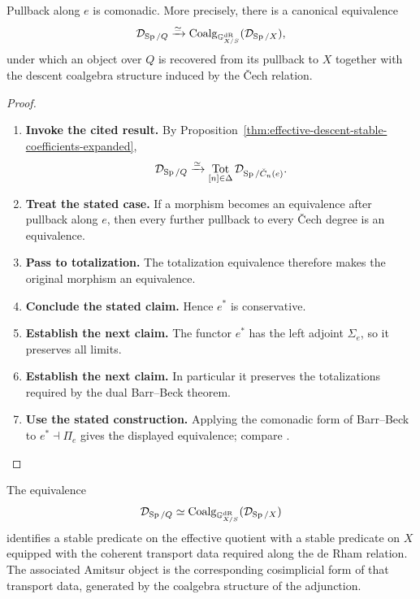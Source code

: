 \begin{theorem}
\label{thm:comonadic-effective-descent-de-Rham}
Pullback along \(e\) is comonadic. More precisely, there is a canonical
equivalence
\[
  \mathcal D_{\operatorname{Sp}/Q}
  \xrightarrow{\simeq}
  \operatorname{Coalg}_{\mathbb G^{\mathrm{dR}}_{X/S}}(\mathcal D_{\operatorname{Sp}/X}),
\]
under which an object over \(Q\) is recovered from its pullback to \(X\) together
with the descent coalgebra structure induced by the \v{C}ech relation.
\end{theorem}

\begin{proof}
\leavevmode
\begin{enumerate}[label=\textup{(\arabic*)}]
    \item \textbf{Invoke the cited result.}
    By Proposition~\ref{thm:effective-descent-stable-coefficients-expanded},
    \[
    \mathcal D_{\operatorname{Sp}/Q}
    \xrightarrow{\simeq}
    \operatorname*{Tot}_{[n]\in\Delta}\mathcal D_{\operatorname{Sp}/\check C_n(e)}.
    \]
    \item \textbf{Treat the stated case.}
    If a morphism becomes an equivalence after pullback along \(e\), then every
    further pullback to every \v{C}ech degree is an equivalence.
    \item \textbf{Pass to totalization.}
    The totalization
    equivalence therefore makes the original morphism an equivalence.
    \item \textbf{Conclude the stated claim.}
    Hence
    \(e^*\) is conservative.
    \item \textbf{Establish the next claim.}
    The functor \(e^*\) has the left adjoint \(\Sigma_e\), so it preserves all
    limits.
    \item \textbf{Establish the next claim.}
    In particular it preserves the totalizations required by the dual
    Barr--Beck theorem.
    \item \textbf{Use the stated construction.}
    Applying the comonadic form of Barr--Beck to
    \(e^*\dashv\Pi_e\) gives the displayed equivalence; compare
    \cite[Theorem~4.7.3.5]{LurieHigherAlgebra}.
\end{enumerate}
\end{proof}

\begin{remark}
The equivalence
\[
  \mathcal D_{\operatorname{Sp}/Q}
  \simeq
  \operatorname{Coalg}_{\mathbb G^{\mathrm{dR}}_{X/S}}(\mathcal D_{\operatorname{Sp}/X})
\]
identifies a stable predicate on the effective quotient with a stable predicate on
\(X\) equipped with the coherent transport data required along the de Rham
relation. The associated Amitsur object is the corresponding cosimplicial form of that
transport data, generated by the coalgebra structure of the adjunction.
\end{remark}

